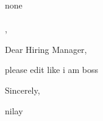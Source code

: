 \documentclass[11pt,a4paper]{letter}
\begin{document}
\begin{letter}{none\\
\\
, }

\address{nilay\\
\\
, \\
9016989674\\
\href{mailto:nilaypatel@gmail.com}{nilaypatel@gmail.com}}

\date{April 11, 2025}

\opening{Dear Hiring Manager,}

please edit like i am boss



\closing{Sincerely,}

\vspace{0.5in}
nilay

\end{letter}
\end{document}
